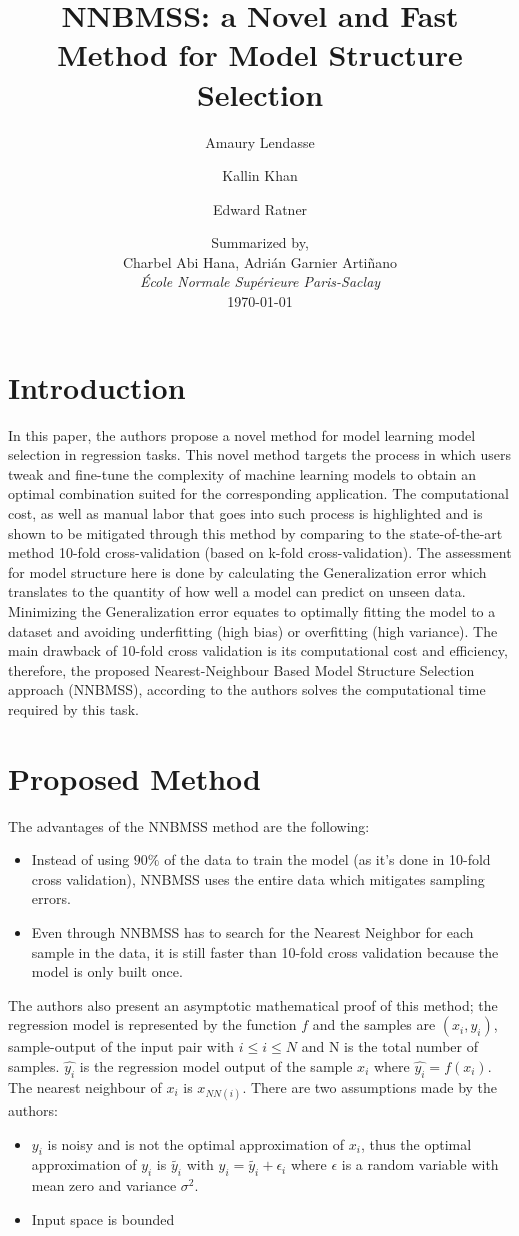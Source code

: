 \documentclass[a4paper]{article}
\title{NNBMSS: a Novel and Fast Method for Model
Structure Selection}
\date{Summarized by, \\ Charbel Abi Hana, Adrián Garnier Artiñano \\ \textit{École Normale Supérieure Paris-Saclay} \\\medskip\today}
\author[1,2]{Amaury Lendasse}
\author[3]{Kallin Khan}
\author[3]{Edward Ratner}
\affil[1]{University of Houston - Department of Information and Logistics Technology
Houston - USA}
\affil[2]{Arcada University of Applied Sciences - Risklab
Helsinki - Finland}
\affil[3]{Edammo Inc.
Iowa City - USA}
\begin{document}
\maketitle
\section{Introduction}
In this paper, the authors propose a novel method for model learning model selection in regression tasks. This novel method targets the process in which users tweak and fine-tune the complexity of machine learning models to obtain an optimal combination suited for the corresponding application. The computational cost, as well as manual labor that goes into such process is highlighted and is shown to be mitigated through this method by comparing to the state-of-the-art method 10-fold cross-validation (based on k-fold cross-validation). The assessment for model structure here is done by calculating the Generalization error which translates to the quantity of how well a model can predict on unseen data. Minimizing the Generalization error equates to optimally fitting the model to a dataset and avoiding underfitting (high bias) or overfitting (high variance). The main drawback of 10-fold cross validation is its computational cost and efficiency, therefore, the proposed Nearest-Neighbour Based Model Structure Selection approach (NNBMSS), according to the authors solves the computational time required by this task.

\section{Proposed Method}
The advantages of the NNBMSS method are the following:
\begin{itemize}
    \item Instead of using $ 90\% $ of the data to train the model (as it's done in 10-fold cross validation), NNBMSS uses the entire data which mitigates sampling errors.
    \item Even through NNBMSS has to search for the Nearest Neighbor for each sample in the data, it is still faster than 10-fold cross validation because the model is only built once.
\end{itemize}
The authors also present an asymptotic mathematical proof of this method; the regression model is represented by the function $f$ and the samples are $(x_i, y_i)$, sample-output of the input pair with $i \leq i \leq N$ and N is the total number of samples. $\hat{y_i}$ is the regression model output of the sample $x_i$ where $\hat{y_i} = f(x_i)$. The nearest neighbour of $x_i$ is $x_{NN(i)}$. There are two assumptions made by the authors:
\begin{itemize}
    \item $y_i$ is noisy and is not the optimal approximation of $x_i$, thus the optimal approximation of $y_i$ is $\widetilde{y_i}$ with $y_i = \widetilde{y_i} + \epsilon_i$ where $\epsilon$ is a random variable with mean zero and variance $\sigma^2$.
    \item Input space is bounded
\end{itemize}
\end{document}
